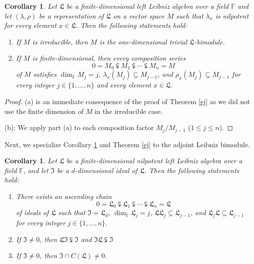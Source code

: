 \documentclass{amsart}
\newtheorem{cor}[thm]{Corollary}
\numberwithin{equation}{section}
\newcommand{\F}{\mathbb{F}}
\newcommand{\lf}{\mathfrak{L}}
\newcommand{\If}{\mathfrak{I}}
\begin{document}
\begin{cor}\label{striang}
Let $\lf$ be a finite-dimensional  left Leibniz algebra over a field $\F$ and let $(\lambda,\rho)$ be
a representation of $\lf$ on a vector space $M$ such that $\lambda_x$ is nilpotent for every
element $x\in\lf$. Then the following statements hold:
\begin{enumerate}
\item[(a)] If $M$ is irreducible, then $M$ is the one-dimensional trivial $\lf$-bimodule.
\item[(b)] If $M$ is finite-dimensional, then every composition series $$0=M_0\subsetneqq M_1
                \subsetneqq\cdots\subsetneqq M_n=M$$ of $M$ satisfies $\dim_\F M_j=j$, $\lambda_x
                (M_j)\subseteq M_{j-1}$, and $\rho_x(M_j)\subseteq M_{j-1}$ for every integer $j\in
                \{1,\dots,n\}$ and every element $x\in\lf$.
\end{enumerate}
\end{cor}

\begin{proof}
(a) is an immediate consequence of the proof of Theorem \ref{ej} as we did not use the finite
dimension of $M$ in the irreducible case.

(b): We apply part (a) to each composition factor $M_j/M_{j-1}$ ($1\le j\le n$).
\end{proof}

Next, we specialize Corollary \ref{striang} and Theorem \ref{ej} to the adjoint Leibniz bimodule.

\begin{cor}\label{adjbimodnilp}
Let $\lf$ be a finite-dimensional  nilpotent left Leibniz algebra over a field $\F$, and let $\If$ be a
$d$-dimensional ideal of $\lf$. Then the following statements hold:
\begin{enumerate}
\item[(a)] There exists an ascending chain $$0=\lf_0\subsetneqq\lf_1\subsetneqq\cdots\subsetneqq
                \lf_n=\lf$$ of ideals of $\lf$ such that $\If=\lf_d$, $\dim_\F\lf_j=j$, $\lf\lf_j\subseteq
                \lf_{j-1}$, and $\lf_j\lf\subseteq\lf_{j-1}$ for every integer $j\in\{1,\dots,n\}$.
\item[(b)] If $\If\ne 0$, then $\lf\If\subsetneqq\If$ and $\If\lf\subsetneqq\If$
\item[(c)] If $\If\ne 0$, then $\If\cap C(\lf)\ne 0$.
\end{enumerate}
\end{cor}
\end{document}
